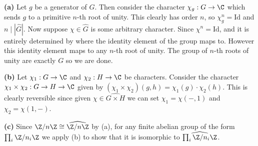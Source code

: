 \documentclass[11pt,letterpaper]{article}
\begin{document}
\begin{solution}
    \textbf{(a)} Let $g$ be a generator of $G$. Then consider the character $\chi_g : G \to \C$ which sends $g$ to a primitive $n$-th root of unity. This clearly has order $n$, so $\chi_g^n=\textrm{Id}$ and $n \mid |\widehat{G}|$. Now suppose $\chi\in \widehat{G}$ is some arbitrary character. Since $\chi^n=\textrm{Id}$, and it is entirely determined by where the identity element of the group maps to. However this identity element maps to any $n$-th root of unity. The group of $n$-th roots of unity are exactly $G$ so we are done.

    \textbf{(b)} Let $\chi_1 : G \to \C$ and $\chi_2 : H \to \C$ be characters. Consider the character $\chi_1\times \chi_2 : G\to H \to \C$ given by $(\chi_1\times\chi_2)(g,h) = \chi_1(g)\cdot \chi_2(h)$. This is clearly reversible since given $\chi\in\widehat{G\times H}$ we can set $\chi_1 = \chi(-,1)$ and $\chi_2=\chi(1,-)$.

    \textbf{(c)} Since $\Z/n\Z\cong \widehat{\Z/n\Z}$ by (a), for any finite abelian group of the form $\prod_i \Z/n_i\Z$ we apply (b) to show that it is isomorphic to $\widehat{\prod_i\Z/n_i\Z}$.
\end{solution}
\end{document}
